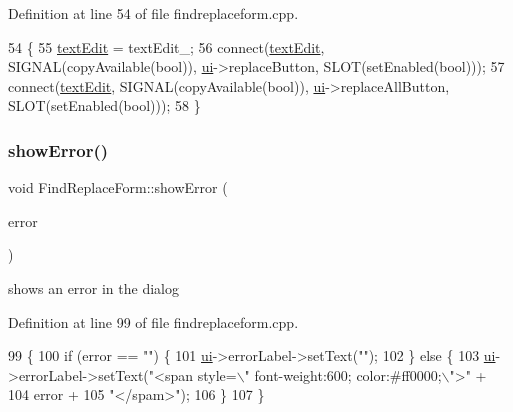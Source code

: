 Definition at line 54 of file findreplaceform.\+cpp.


\begin{DoxyCode}
54                                                       \{
55     \hyperlink{class_find_replace_form_a6ddb6c32035bcafdd085c457c1ac125c}{textEdit} = textEdit\_;
56     connect(\hyperlink{class_find_replace_form_a6ddb6c32035bcafdd085c457c1ac125c}{textEdit}, SIGNAL(copyAvailable(\textcolor{keywordtype}{bool})), \hyperlink{class_find_replace_form_a9bf9e9096feff863dcd6c2a989e07d2c}{ui}->replaceButton, SLOT(setEnabled(\textcolor{keywordtype}{bool})));
57     connect(\hyperlink{class_find_replace_form_a6ddb6c32035bcafdd085c457c1ac125c}{textEdit}, SIGNAL(copyAvailable(\textcolor{keywordtype}{bool})), \hyperlink{class_find_replace_form_a9bf9e9096feff863dcd6c2a989e07d2c}{ui}->replaceAllButton, SLOT(setEnabled(\textcolor{keywordtype}{bool})));
58 \}
\end{DoxyCode}
\mbox{\label{class_find_replace_form_a49bcdfa2193f0fb5fa8ccbbf1875d893}} 
\subsubsection{\texorpdfstring{show\+Error()}{showError()}}
{\footnotesize\ttfamily void Find\+Replace\+Form\+::show\+Error (\begin{DoxyParamCaption}\item[{const Q\+String \&}]{error }\end{DoxyParamCaption})\hspace{0.3cm}{\ttfamily [protected]}}



shows an error in the dialog 



Definition at line 99 of file findreplaceform.\+cpp.


\begin{DoxyCode}
99                                                     \{
100     \textcolor{keywordflow}{if} (error == \textcolor{stringliteral}{""}) \{
101         \hyperlink{class_find_replace_form_a9bf9e9096feff863dcd6c2a989e07d2c}{ui}->errorLabel->setText(\textcolor{stringliteral}{""});
102     \} \textcolor{keywordflow}{else} \{
103         \hyperlink{class_find_replace_form_a9bf9e9096feff863dcd6c2a989e07d2c}{ui}->errorLabel->setText(\textcolor{stringliteral}{"<span style=\(\backslash\)" font-weight:600; color:#ff0000;\(\backslash\)">"} +
104                                 error +
105                                 \textcolor{stringliteral}{"</spam>"});
106     \}
107 \}
\end{DoxyCode}
\mbox{\label{class_find_replace_form_a39929b108e4e85a9d64366777e9fde22}} 
